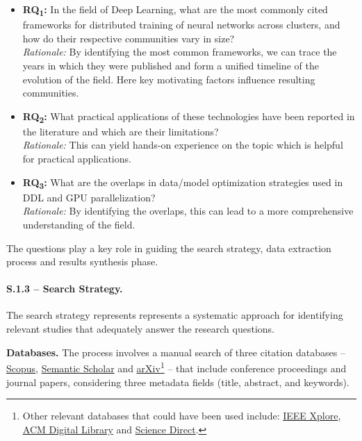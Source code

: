 \label{sec:research_questions_refined}
\begin{itemize}
	\item \textbf{RQ\textsubscript{1}:} In the field of Deep Learning, what are the most commonly cited
	      frameworks for distributed training of neural networks across clusters, and how do their respective communities vary in size? \\
	      \textit{Rationale:} By identifying the most common frameworks, we can trace the years in which they were published
	      and form a unified timeline of the evolution of the field. Here key motivating factors influence resulting communities.

	\item \textbf{RQ\textsubscript{2}:} What practical applications of these technologies have been reported in the literature
	      and which are their limitations? \\
	      \textit{Rationale:} This can yield hands-on experience on the topic which is helpful for practical applications.

	\item \textbf{RQ\textsubscript{3}:} What are the overlaps in data/model optimization strategies used in DDL and GPU parallelization? \\
	      \textit{Rationale:} By identifying the overlaps, this can lead to a more comprehensive understanding of the field.
\end{itemize}


The questions play a key role in guiding the search strategy, data extraction process and results
synthesis phase.

\paragraph{S.1.3 -- Search Strategy.}
The search strategy represents represents a systematic approach for identifying relevant studies
that adequately answer the research questions.

\textbf{Databases.}
The process involves a manual search of three citation databases --
\href{https://www.scopus.com/}{Scopus}, \href{https://www.semanticscholar.org/}{Semantic Scholar}
and \href{https://arxiv.org/}{arXiv}\footnote{Other relevant databases that could have been used
	include: \href{https://ieeexplore.ieee.org/}{IEEE Xplore}, \href{https://dl.acm.org/}{ACM Digital
		Library} and \href{https://www.sciencedirect.com/}{Science Direct}.} -- that include conference
proceedings and journal papers, considering three metadata fields (title, abstract, and keywords).

